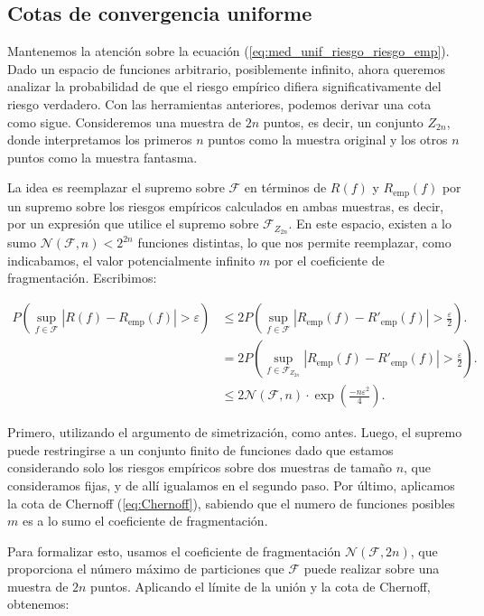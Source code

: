 \documentclass{report}
\begin{document}
\subsection{Cotas de convergencia uniforme}

Mantenemos la atención sobre la ecuación (\ref{eq:med_unif_riesgo_riesgo_emp}). Dado un espacio de funciones arbitrario,
posiblemente infinito, ahora queremos analizar la probabilidad
de que el riesgo empírico difiera significativamente del riesgo verdadero. Con las herramientas anteriores,
podemos derivar una cota como sigue. Consideremos una muestra de \(2n\) puntos, es decir, un conjunto
\(Z_{2n}\), donde interpretamos los primeros \(n\) puntos como la muestra original y los otros \(n\)
puntos como la muestra fantasma.

La idea es reemplazar el supremo sobre \(\mathcal{F}\) en términos de \(R(f)\) y
\(R_{\text{emp}}(f)\) por un supremo sobre los riesgos empíricos calculados en ambas muestras, es decir, por un expresión
que utilice el supremo sobre \(\mathcal{F}_{Z_{2n}}\). En este espacio, existen a lo sumo $\mathcal{N}(\mathcal{F}, n)<2^{2n}$
funciones distintas, lo que nos permite reemplazar, como indicabamos, el valor potencialmente infinito $m$ por el coeficiente de
fragmentación. Escribimos:

\[
\begin{aligned}
P\left(\sup_{f \in \mathcal{F}} |R(f) - R_{\text{emp}}(f)| > \varepsilon\right) &\leq
2P\left(\sup_{f \in \mathcal{F}} |R_{\text{emp}}(f) - R'_{\text{emp}}(f)| > \frac{\varepsilon}{2}\right).\\
& = 2P\left(\sup_{f \in \mathcal{F}_{Z_{2n}}} |R_{\text{emp}}(f) - R'_{\text{emp}}(f)| > \frac{\varepsilon}{2}\right).\\
& \leq 2  \mathcal{N}(\mathcal{F}, n)\cdot \exp\left(\frac{-n\varepsilon^2}{4}\right).
\end{aligned}
\]

Primero, utilizando el argumento de simetrización, como antes. Luego, el supremo puede restringirse a un conjunto finito de funciones
dado que estamos considerando solo los riesgos empíricos sobre dos muestras de tamaño $n$, que consideramos fijas, y de allí igualamos
en el segundo paso. Por último, aplicamos la cota de Chernoff (\ref{eq:Chernoff}), sabiendo que el numero de funciones
posibles $m$ es a lo sumo el coeficiente de fragmentación.

Para formalizar esto, usamos el coeficiente de fragmentación \(\mathcal{N}(\mathcal{F}, 2n)\), que proporciona el número máximo
de particiones que \(\mathcal{F}\) puede realizar sobre una muestra de \(2n\) puntos. Aplicando el límite de la unión
y la cota de Chernoff, obtenemos:
\end{document}
